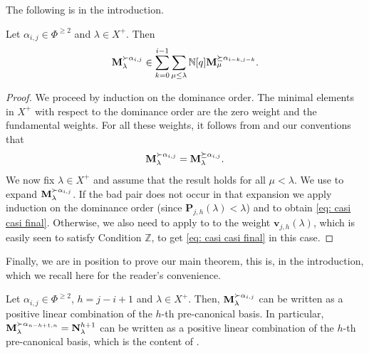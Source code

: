 The following is  in the introduction.


\begin{theorem}\label{teo: theo D in the main}
    Let $\alpha_{i,j} \in \Phi^{\geq 2}$ and $\lambda \in X^+$. 
    Then 
 \begin{equation}  \label{eq: casi casi final}
      \mathbf{M}_{\lambda}^{\succ \alpha_{i,j} } \in  \sum_{k=0}^{i-1}  \sum_{\mu \leq \lambda} \mathbb{N}[q] \mathbf{M}_{ \mu }^{\succeq \alpha_{i-k,j-k}}.      
 \end{equation}
\end{theorem}

\begin{proof}
    We proceed by induction on the dominance order. 
    The minimal elements in $X^+$ with respect to the dominance order are the zero weight and the fundamental weights. 
    For all these weights, it follows from  and our conventions that 
    \begin{equation}
        \mathbf{M}_{\lambda}^{\succ \alpha_{i,j}} = \mathbf{M}_{\lambda}^{\succeq \alpha_{i,j}}. 
    \end{equation}
We now fix $\lambda \in X^{+}$ and assume that the result holds for all $\mu <\lambda$. 
We use  
to expand $\mathbf{M}_{\lambda}^{\succ \alpha_{i,j}}$. 
If the bad pair does not occur in that expansion we apply  induction on the dominance order (since $\mathbf{P}_{j,h}(\lambda)< \lambda$) and 
  to obtain \eqref{eq: casi casi final}. 
Otherwise, we also need to apply to   to the weight $\mathbf{v}_{j,h}(\lambda)$, which is easily seen to satisfy Condition $\mathbb{Z}$, to get \eqref{eq: casi casi final} in this case. 
\end{proof}


Finally, we are in position to prove our main theorem, this is,  in the introduction, which we recall here for the reader's convenience.  

\begin{theorem}
     Let $\alpha_{i,j} \in \Phi^{\geq 2} $, $h=j-i+1$ and $\lambda \in X^+$. 
    Then, $ \mathbf{M}_{\lambda}^{\succ \alpha_{i,j} }$ can be written as a positive linear combination of the $h$-th pre-canonical basis. 
    In particular, $ \mathbf{M}_{\lambda}^{\succ \alpha_{n-h+1,n} }=\mathbf{N}^{h+1}_\lambda $ can be written as a positive linear combination of the $h$-th pre-canonical basis, which is the content of .  
\end{theorem}

